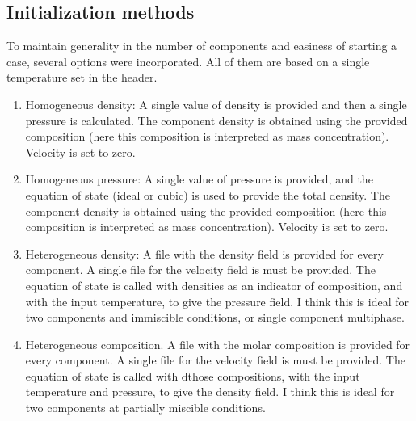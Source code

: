\documentclass{article}
\begin{document}
	\subsection{Initialization methods}
	To maintain generality in the number of components and easiness of starting a case, several options were incorporated. All of them are based on a single temperature set in the header.
	\begin{enumerate}
		\item Homogeneous density: A single value of density is provided and then a single pressure is calculated. The component density is obtained using the provided composition (here this composition is interpreted as mass concentration). Velocity is set to zero.
		
		\item Homogeneous pressure: A single value of pressure is provided, and the equation of state (ideal or cubic) is used to provide the total density. The component density is obtained using the provided composition (here this composition is interpreted as mass concentration). Velocity is set to zero.
		
		\item Heterogeneous density: A file with the density field is provided for every component. A single file for the velocity field is must be provided. The equation of state is called with densities as an indicator of composition, and with the input temperature, to give the pressure field. I think this is ideal for two components and immiscible conditions, or single component multiphase. 
		
		\item Heterogeneous composition. A file with the molar composition is provided for every component. A single file for the velocity field is must be provided. The equation of state is called with dthose compositions, with the input temperature and pressure, to give the density field. I think this is ideal for two components  at partially miscible conditions. 
	\end{enumerate}
	
\end{document}

